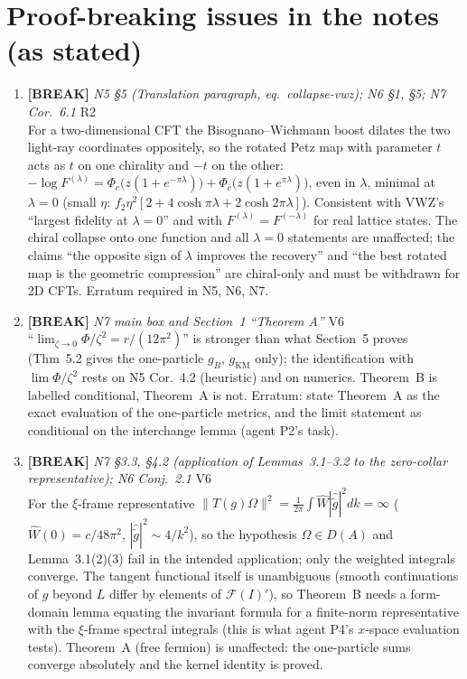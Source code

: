 \documentclass[11pt]{article}
\begin{document}
\section{Proof-breaking issues in the notes (as stated)}
\begin{enumerate}[leftmargin=1.6em,itemsep=6pt]
\item \textbf{[BREAK]} \emph{N5 \S5 (Translation paragraph, eq.\ collapse-vwz); N6 \S1, \S5; N7 Cor.~6.1} \hfill\textsc{R2}\\ For a two-dimensional CFT the Bisognano--Wichmann boost dilates the two light-ray coordinates oppositely, so the rotated Petz map with parameter \(t\) acts as \(t\) on one chirality and \(-t\) on the other: \(-\log F^{(\lambda)}=\Phi_c\bigl(z(1+e^{-\pi\lambda})\bigr)+\Phi_{\bar c}\bigl(z(1+e^{\pi\lambda})\bigr)\), even in \(\lambda\), minimal at \(\lambda=0\) (small \(\eta\): \(f_2\eta^2[2+4\cosh\pi\lambda+2\cosh2\pi\lambda]\)). Consistent with VWZ's ``largest fidelity at \(\lambda=0\)'' and with \(F^{(\lambda)}=F^{(-\lambda)}\) for real lattice states. The chiral collapse onto one function and all \(\lambda=0\) statements are unaffected; the claims ``the opposite sign of \(\lambda\) improves the recovery'' and ``the best rotated map is the geometric compression'' are chiral-only and must be withdrawn for 2D CFTs. Erratum required in N5, N6, N7.
\item \textbf{[BREAK]} \emph{N7 main box and Section~1 ``Theorem A''} \hfill\textsc{V6}\\ ``\(\lim_{\zeta\to0}\Phi/\zeta^2=r/(12\pi^2)\)'' is stronger than what Section~5 proves (Thm~5.2 gives the one-particle \(g_B\), \(g_{\mathrm{KM}}\) only); the identification with \(\lim\Phi/\zeta^2\) rests on N5 Cor.~4.2 (heuristic) and on numerics. Theorem~B is labelled conditional, Theorem~A is not. Erratum: state Theorem~A as the exact evaluation of the one-particle metrics, and the limit statement as conditional on the interchange lemma (agent P2's task).
\item \textbf{[BREAK]} \emph{N7 \S3.3, \S4.2 (application of Lemmas~3.1--3.2 to the zero-collar representative); N6 Conj.~2.1} \hfill\textsc{V6}\\ For the \(\xi\)-frame representative \(\|T(g)\Omega\|^2=\frac1{2\pi}\int\widehat W|\widehat{\widetilde g}|^2dk=\infty\) (\(\widehat W(0)=c/48\pi^2\), \(|\widehat{\widetilde g}|^2\sim4/k^2\)), so the hypothesis \(\Omega\in D(A)\) and Lemma~3.1(2)(3) fail in the intended application; only the weighted integrals converge. The tangent functional itself is unambiguous (smooth continuations of \(g\) beyond \(L\) differ by elements of \(\mathcal F(I)'\)), so Theorem~B needs a form-domain lemma equating the invariant formula for a finite-norm representative with the \(\xi\)-frame spectral integrals (this is what agent P4's \(x\)-space evaluation tests). Theorem~A (free fermion) is unaffected: the one-particle sums converge absolutely and the kernel identity is proved.

\end{enumerate}
\end{document}
